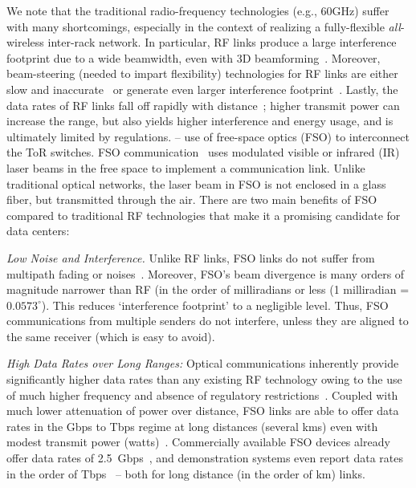  We note that the
traditional radio-frequency technologies (e.g., 60GHz) suffer with
many shortcomings, especially in the context of realizing a
fully-flexible {\em all}-wireless inter-rack network. In particular,
RF links produce a large interference footprint due to a wide
beamwidth, even with 3D beamforming~\cite{3db}. Moreover,
beam-steering (needed to impart flexibility) technologies for RF links
are either slow and inaccurate~\cite{3db} or generate even larger
interference footprint~\cite{phased-arrays-rf}.
%
Lastly, the data rates of RF links fall off rapidly with
distance~\cite{3db}; higher transmit power can increase the range, but
also yields higher interference and energy usage, and is ultimately
limited by regulations.
%
 -- use of free-space optics (FSO) to interconnect the ToR
switches. FSO communication~\cite{kedar} uses modulated visible or
infrared (IR) laser beams in the free space to implement a
communication link. Unlike traditional optical networks, the laser
beam in FSO is not enclosed in a glass fiber, but transmitted through
the air. There are two main benefits of FSO compared to traditional RF
technologies that make it a promising candidate for data centers:
%
\squishlist
\item[(a)] {\em Low Noise and Interference.}  Unlike RF links, FSO
  links do not suffer from multipath fading or 
  noises~\cite{}.  Moreover, FSO's beam divergence is many orders of
  magnitude narrower than RF (in the order of milliradians or less (1
  milliradian = $0.0573^\circ$). This reduces `interference footprint'
  to a negligible level.  Thus, FSO communications from multiple
  senders do not interfere, unless they are aligned to the same
  receiver (which is easy to avoid).

 \item[(b)]
  {\em High Data Rates over Long Ranges:}  Optical communications
inherently provide significantly higher data rates than any existing RF
technology owing to the use of much higher frequency and absence of
regulatory restrictions~\cite{kedar}. Coupled with much lower
attenuation of power over distance, FSO links are able to offer data
rates in the Gbps to Tbps regime at long distances (several kms) even
with modest transmit power (watts)~\cite{kedar}.
%
Commercially available FSO devices already offer data rates of
2.5~Gbps~\cite{fsona}, and demonstration systems even report data
rates in the order of Tbps~\cite{mustafa2013reintroducing} -- both for
long distance (in the order of km) links.
\squishend

